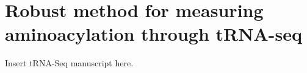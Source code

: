 \chapter{Robust method for measuring aminoacylation through tRNA-seq}
Insert tRNA-Seq manuscript here.
